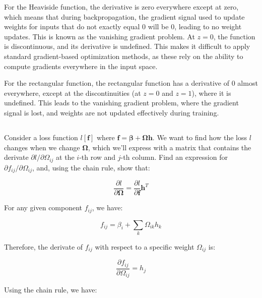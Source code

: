 \documentclass[12pt]{report}
\begin{document}
For the Heaviside function, the derivative is zero everywhere except at zero, which means that during backpropagation, the gradient signal used to update weights for inputs that do not exactly equal 0 will be 0, leading to no weight updates. This is known as the vanishing gradient problem. At $z=0$, the function is discontinuous, and its derivative is undefined. This makes it difficult to apply standard gradient-based optimization methods, as these rely on the ability to compute gradients everywhere in the input space.

For the rectangular function, the rectangular function has a derivative of 0 almost everywhere, except at the discontinuities (at $z=0$ and $z=1$), where it is undefined. This leads to the vanishing gradient problem, where the gradient signal is lost, and weights are not updated effectively during training.

\subsection{}
\begin{mdframed}
    Consider a loss function $l[\mathbf{f}]$ where $\mathbf{f} = \boldsymbol{\beta} + \boldsymbol{\Omega}\mathbf{h}$. We want to find how the loss $l$ changes when we change $\boldsymbol{\Omega}$, which we'll express with a matrix that contains the derivate $\partial l / \partial \Omega_{ij}$ at the $i$-th row and $j$-th column. Find an expression for $\partial f_{ij} / \partial \Omega_{ij}$, and, using the chain rule, show that:

    \begin{equation*}
        \frac{\partial l}{\partial \boldsymbol{\Omega}} = \frac{\partial l}{\partial \mathbf{f}}\mathbf{h}^{T}
    \end{equation*}
\end{mdframed}

For any given component $f_{ij}$, we have:

\begin{equation*}
    f_{ij} = \beta_{i} + \sum_{k} \Omega_{ik}h_{k}
\end{equation*}

Therefore, the derivate of $f_{ij}$ with respect to a specific weight $\Omega_{ij}$ is:

\begin{equation*}
    \frac{\partial f_{ij}}{\partial \Omega_{ij}} = h_{j}
\end{equation*}

Using the chain rule, we have:
\end{document}
